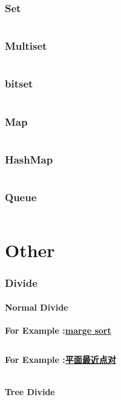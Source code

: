 \documentclass[a4paper,10pt]{article}
\begin{document}
		\section{Set}
			\inputminted[breaklines]{c++}{STL/set.cc}
		\section{Multiset}
		 	\inputminted[breaklines]{c++}{STL/multiset.cc}
		\section{bitset}
			\inputminted[breaklines]{c++}{STL/bitset.cc}
		\section{Map}
			\inputminted[breaklines]{c++}{STL/map.cc}
        \section{HashMap}
            \inputminted[breaklines]{c++}{STL/Hashmap.cc}
		\section{Queue}
			\inputminted[breaklines]{c++}{STL/queue.cc}
	
	\newpage
	\part{Other} %
        \section{Divide}
            \subsection{Normal Divide}
                \textbf{For Example :}\underline{\textbf{marge sort}}\\
                    \inputminted[breaklines]{c++}{Other/normal-divide.cc} 
                
                \textbf{For Example :}\underline{\textbf{平面最近点对}}\\
                \inputminted[breaklines]{c++}{Other/normal-divide-2.cc}
                
            \subsection{Tree Divide}
\end{document}
